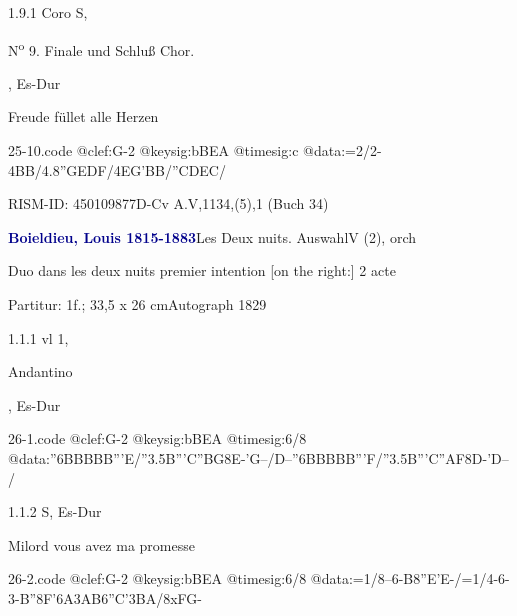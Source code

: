 \documentclass[a4paper, twocolumn, 11pt]{book}
\begin{document}
\newline %
\par 1.9.1  Coro S, \begin{itshape}N\textsuperscript{o} 9. Finale und Schluß Chor.\end{itshape}, Es-Dur\newline \begin{footnotesize} Freude füllet alle Herzen \end{footnotesize}  
\begin{filecontents*}{25-10.code}
@clef:G-2
@keysig:bBEA
@timesig:c
@data:=2/2-4BB/4.8''GEDF/4EG'BB/''CDEC/
\end{filecontents*}

\newline %
\par RISM-ID: 450109877\newline D-Cv  A.V,1134,(5),1 (Buch 34)
\par \vspace{16pt} \textcolor{darkblue}{\textbf{Boieldieu, Louis  1815-1883}}\hfillplus{[26]}\newline Les Deux nuits. Auswahl\newline V (2), orch
\par \begin{itshape}[heading:] Duo dans les deux nuits premier intention [on the right:] 2 acte\end{itshape} 
\par \textcolor{darkblue}{}  Partitur: 1f.; 33,5 x 26 cm\newline Autograph  1829
\par 1.1.1  vl 1, \begin{itshape}Andantino\end{itshape}, Es-Dur  
\begin{filecontents*}{26-1.code}
@clef:G-2
@keysig:bBEA
@timesig:6/8
@data:''{6BBBBB'''E}/''{3.5B'''C''BG}8E-'G--/D--''{6BBBBB'''F}/''{3.5B'''C''AF}8D-'D--/
\end{filecontents*}

\newline %
\par 1.1.2  S, Es-Dur\newline \begin{footnotesize} Milord vous avez ma promesse \end{footnotesize}  
\begin{filecontents*}{26-2.code}
@clef:G-2
@keysig:bBEA
@timesig:6/8
@data:=1/8--6-B{8''E'E}-/=1/4-6-3-B''{8F'6A}3AB6''C'3BA/8xFG-
\end{filecontents*}
\end{document}
